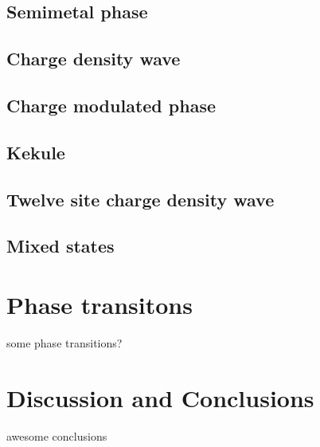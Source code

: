 \documentclass[aps,prx,10pt,twocolumn,floatfix,superscriptaddress,showpacs,numerical,footinbib]{revtex4-1}
\begin{document}
\subsection{Semimetal phase}
%
\subsection{Charge density wave}
%
\subsection{Charge modulated phase}
%
\subsection{Kekule}
%
\subsection{Twelve site charge density wave}
%
\subsection{Mixed states}
%
\section{Phase transitons}
%
some phase transitions?
%
\section{Discussion and Conclusions}
%
awesome conclusions


\end{document}
